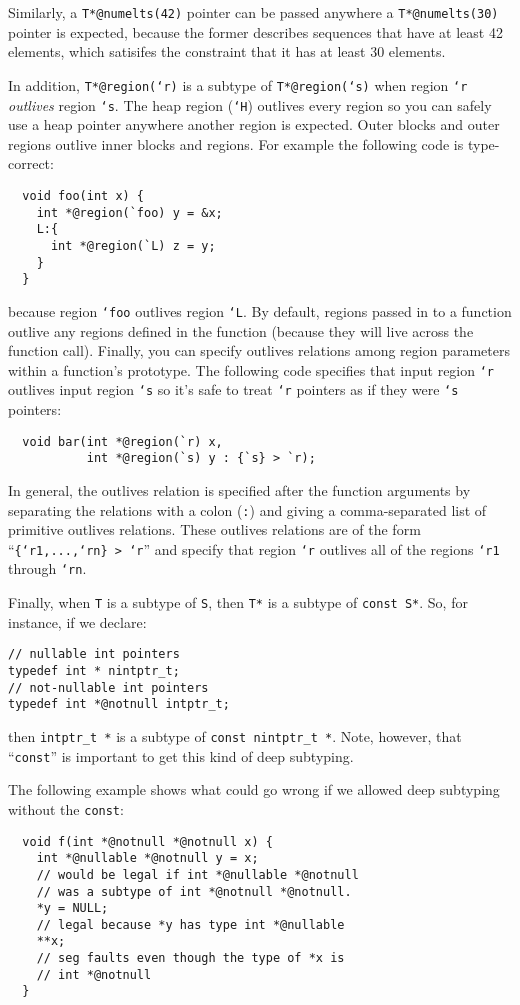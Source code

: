Similarly, a \texttt{T*@numelts(42)} pointer can be passed anywhere a
\texttt{T*@numelts(30)} pointer is expected, because the former
describes sequences that have at least 42 elements, which satisifes
the constraint that it has at least 30 elements.

In addition, \texttt{T*@region(`r)} is a subtype of \texttt{T*@region(`s)}
when region \texttt{`r} \emph{outlives} region \texttt{`s}.  The
heap region (\texttt{`H}) outlives every region so you can safely
use a heap pointer anywhere another region is expected.  Outer
blocks and outer regions outlive inner blocks and regions.  For
example the following code is type-correct:
\begin{verbatim}
  void foo(int x) {
    int *@region(`foo) y = &x;
    L:{
      int *@region(`L) z = y;
    }
  }
\end{verbatim}
because region \texttt{`foo} outlives region \texttt{`L}.  By
default, regions passed in to a function outlive any regions
defined in the function (because they will live across the
function call).  Finally, you can specify outlives relations
among region parameters within a function's prototype.  The
following code specifies that input region \texttt{`r} outlives
input region \texttt{`s} so it's safe to treat \texttt{`r} pointers
as if they were \texttt{`s} pointers:
\begin{verbatim}
  void bar(int *@region(`r) x,
           int *@region(`s) y : {`s} > `r);
\end{verbatim}
In general, the outlives relation is specified after the function
arguments by separating the relations with a colon (\texttt{:}) and
giving a comma-separated list of primitive outlives relations.
These outlives relations are of the form ``\texttt{\{`r1,...,`rn\} > `r}''
and specify that region \texttt{`r} outlives all of the regions
\texttt{`r1} through \texttt{`rn}.

Finally, when \texttt{T} is a subtype of \texttt{S}, then
\texttt{T*} is a subtype of \texttt{const S*}.  So, for
instance, if we declare:
\begin{verbatim}
// nullable int pointers
typedef int * nintptr_t;
// not-nullable int pointers
typedef int *@notnull intptr_t;
\end{verbatim}
then \texttt{intptr_t *} is a subtype of \texttt{const nintptr_t *}.
Note, however, that ``\texttt{const}'' is important to get this
kind of deep subtyping.  

The following example shows what could go wrong if we allowed
deep subtyping without the \texttt{const}:
\begin{verbatim}
  void f(int *@notnull *@notnull x) {
    int *@nullable *@notnull y = x; 
    // would be legal if int *@nullable *@notnull 
    // was a subtype of int *@notnull *@notnull.
    *y = NULL;    
    // legal because *y has type int *@nullable
    **x;          
    // seg faults even though the type of *x is 
    // int *@notnull
  }
\end{verbatim}

